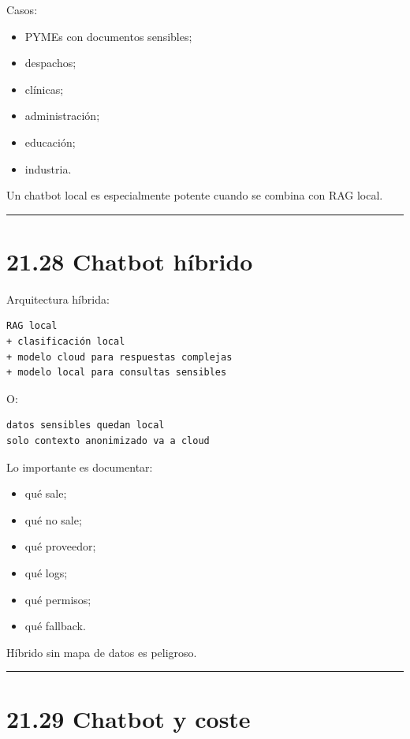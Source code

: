 Casos:

\begin{itemize}
\tightlist
\item
  PYMEs con documentos sensibles;
\item
  despachos;
\item
  clínicas;
\item
  administración;
\item
  educación;
\item
  industria.
\end{itemize}

Un chatbot local es especialmente potente cuando se combina con RAG
local.

\begin{center}\rule{0.5\linewidth}{0.5pt}\end{center}

\section{21.28 Chatbot híbrido}\label{chatbot-huxedbrido}

Arquitectura híbrida:

\begin{lstlisting}
RAG local
+ clasificación local
+ modelo cloud para respuestas complejas
+ modelo local para consultas sensibles
\end{lstlisting}

O:

\begin{lstlisting}
datos sensibles quedan local
solo contexto anonimizado va a cloud
\end{lstlisting}

Lo importante es documentar:

\begin{itemize}
\tightlist
\item
  qué sale;
\item
  qué no sale;
\item
  qué proveedor;
\item
  qué logs;
\item
  qué permisos;
\item
  qué fallback.
\end{itemize}

Híbrido sin mapa de datos es peligroso.

\begin{center}\rule{0.5\linewidth}{0.5pt}\end{center}

\section{21.29 Chatbot y coste}\label{chatbot-y-coste}


